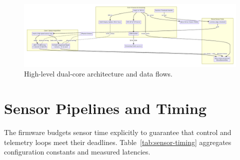 \documentclass[11pt]{article}
\begin{document}
\begin{figure}[h]
  \centering
  \includegraphics[width=0.95\linewidth]{bottle_sumo_architecture.pdf}
  \caption{High-level dual-core architecture and data flows.}
  \label{fig:architecture}
\end{figure}

\section{Sensor Pipelines and Timing}
The firmware budgets sensor time explicitly to guarantee that control and telemetry loops meet their deadlines. Table~\ref{tab:sensor-timing} aggregates configuration constants and measured latencies.
\end{document}
